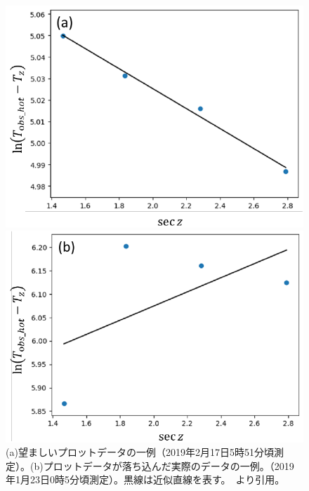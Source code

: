 \begin{figure}[htbp]
    \centering
    \begin{minipage}{0.41\linewidth}
        \centering
        \includegraphics[width=\linewidth]{master_thesis_contents/master_thesis_fig/optical_depth_good.pdf}
    \end{minipage}
    \begin{minipage}{0.45\linewidth}
        \centering
        \includegraphics[scale=0.6]{master_thesis_contents/master_thesis_fig/optical_depth_bad.pdf}
    \end{minipage}
    \caption{(a)望ましいプロットデータの一例（2019年2月17日5時51分頃測定）。(b)プロットデータが落ち込んだ実際のデータの一例。（2019年1月23日0時5分頃測定）。黒線は近似直線を表す。~\cite{goto2021bachelor}より引用。}
    \label{fig:optical_depth_measurement_good_bad}
\end{figure}
